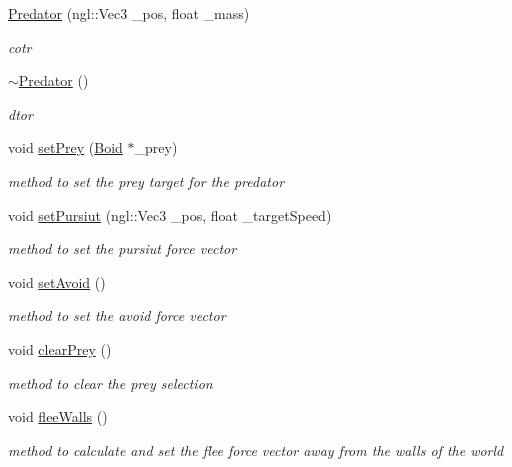 \begin{DoxyCompactItemize}
\item 
\hyperlink{classPredator_ae3a98f1fcce9212de86d15883c501505}{Predator} (ngl::Vec3 \_\-pos, float \_\-mass)
\begin{DoxyCompactList}\small\item\em cotr \item\end{DoxyCompactList}\item 
\hyperlink{classPredator_a9ef1a4a3a5988d1d1e5844a235b36b8b}{$\sim$Predator} ()
\begin{DoxyCompactList}\small\item\em dtor \item\end{DoxyCompactList}\item 
void \hyperlink{classPredator_a076ed210d3facc11144e4d4d02d916cb}{setPrey} (\hyperlink{classBoid}{Boid} $\ast$\_\-prey)
\begin{DoxyCompactList}\small\item\em method to set the prey target for the predator \item\end{DoxyCompactList}\item 
void \hyperlink{classPredator_a2e5d5f04490a8c579c1fc7e4b9886828}{setPursiut} (ngl::Vec3 \_\-pos, float \_\-targetSpeed)
\begin{DoxyCompactList}\small\item\em method to set the pursiut force vector \item\end{DoxyCompactList}\item 
void \hyperlink{classPredator_a54ad9e14349cb678e2a8bef745c77ffb}{setAvoid} ()
\begin{DoxyCompactList}\small\item\em method to set the avoid force vector \item\end{DoxyCompactList}\item 
void \hyperlink{classPredator_a8bfb4bcdf2a341ff8a4602a316c8b842}{clearPrey} ()
\begin{DoxyCompactList}\small\item\em method to clear the prey selection \item\end{DoxyCompactList}\item 
void \hyperlink{classPredator_a1ab812d7b3fc4720eac4b106b40d8800}{fleeWalls} ()
\begin{DoxyCompactList}\small\item\em method to calculate and set the flee force vector away from the walls of the world \item\end{DoxyCompactList}\item 

\end{DoxyCompactItemize}
